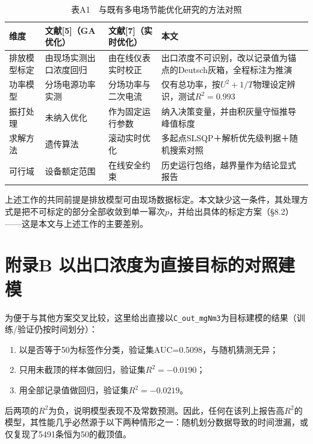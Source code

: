 \documentclass[UTF8,zihao=5,a4paper]{ctexart}
\begin{document}
\begin{table}[htb]
\centering
\caption*{\normalsize 表A1　与既有多电场节能优化研究的方法对照}
\vspace{-2pt}
\begin{tabularx}{\textwidth}{l>{\hsize=0.828\hsize\raggedright\arraybackslash}X>{\hsize=0.770\hsize\raggedright\arraybackslash}X>{\hsize=1.402\hsize\raggedright\arraybackslash}X}
\toprule
维度 & 文献[5]（GA优化） & 文献[7]（实时优化） & 本文 \\
\midrule
排放模型标定 & 由现场实测出口浓度回归 & 由在线仪表实时校正 & 出口浓度不可识别，改以记录值为锚点的Deutsch灰箱，全程标注为推演 \\
功率模型 & 分场电源功率实测 & 分场功率与二次电流 & 仅有总功率，按$U^2+1/T$物理设定辨识，测试$R^2=0.993$ \\
振打处理 & 未纳入优化 & 作为固定运行参数 & 纳入决策变量，并由积灰量守恒推导峰值标度 \\
求解方法 & 遗传算法 & 滚动实时优化 & 多起点SLSQP＋解析优先级判据＋随机搜索对照 \\
可行域 & 设备额定范围 & 在线安全约束 & 历史运行包络，越界量作为结论显式报告 \\
\bottomrule
\end{tabularx}
\end{table}

上述工作的共同前提是排放模型可由现场数据标定。本文缺少这一条件，其处理方式是把不可标定的部分全部收敛到单一幂次$p$，并给出具体的标定方案（§8.2）——这是本文与上述工作的主要差别。

\section*{附录B 以出口浓度为直接目标的对照建模}

为便于与其他方案交叉比较，这里给出直接以\texttt{C\_out\_mgNm3}为目标建模的结果（训练/验证仍按时间划分）：

\begin{enumerate}[itemsep=1pt,topsep=3pt]
\item 以是否等于50为标签作分类，验证集AUC=0.5098，与随机猜测无异；
\item 只用未截顶的样本做回归，验证集$R^2=-0.0190$；
\item 用全部记录值做回归，验证集$R^2=-0.0219$。
\end{enumerate}

后两项的$R^2$为负，说明模型表现不及常数预测。因此，任何在该列上报告高$R^2$的模型，其性能几乎必然源于以下两种情形之一：随机划分数据导致的时间泄漏，或仅复现了5491条恒为50的截顶值。
\end{document}
